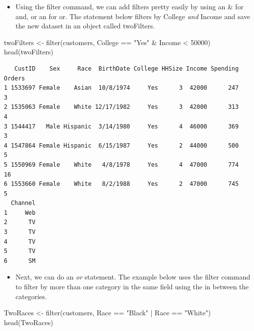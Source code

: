 \documentclass[
  letterpaper,
  DIV=11,
  numbers=noendperiod]{scrreprt}
\newenvironment{Shaded}{\begin{snugshade}}{\end{snugshade}}
\newcommand{\DecValTok}[1]{\textcolor[rgb]{0.68,0.00,0.00}{#1}}
\newcommand{\FunctionTok}[1]{\textcolor[rgb]{0.28,0.35,0.67}{#1}}
\newcommand{\NormalTok}[1]{\textcolor[rgb]{0.00,0.23,0.31}{#1}}
\newcommand{\OtherTok}[1]{\textcolor[rgb]{0.00,0.23,0.31}{#1}}
\newcommand{\SpecialCharTok}[1]{\textcolor[rgb]{0.37,0.37,0.37}{#1}}
\newcommand{\StringTok}[1]{\textcolor[rgb]{0.13,0.47,0.30}{#1}}
\providecommand{\tightlist}{%
  \setlength{\itemsep}{0pt}\setlength{\parskip}{0pt}}\usepackage{longtable,booktabs,array}
\begin{document}
\begin{itemize}
\tightlist
\item
  Using the filter command, we can add filters pretty easily by using an
  \& for and, or an \textbar{} for or. The statement below filters by
  College \emph{and} Income and save the new dataset in an object called
  twoFilters.
\end{itemize}

\begin{Shaded}
\begin{Highlighting}[]
\NormalTok{twoFilters }\OtherTok{\textless{}{-}} \FunctionTok{filter}\NormalTok{(customers, College }\SpecialCharTok{==} \StringTok{"Yes"} \SpecialCharTok{\&}\NormalTok{ Income }\SpecialCharTok{\textless{}} \DecValTok{50000}\NormalTok{)}
\FunctionTok{head}\NormalTok{(twoFilters)}
\end{Highlighting}
\end{Shaded}

\begin{verbatim}
   CustID    Sex     Race  BirthDate College HHSize Income Spending Orders
1 1533697 Female    Asian  10/8/1974     Yes      3  42000      247      3
2 1535063 Female    White 12/17/1982     Yes      3  42000      313      4
3 1544417   Male Hispanic  3/14/1980     Yes      4  46000      369      3
4 1547864 Female Hispanic  6/15/1987     Yes      2  44000      500      5
5 1550969 Female    White   4/8/1978     Yes      4  47000      774     16
6 1553660 Female    White   8/2/1988     Yes      2  47000      745      5
  Channel
1     Web
2      TV
3      TV
4      TV
5      TV
6      SM
\end{verbatim}

\begin{itemize}
\tightlist
\item
  Next, we can do an \emph{or} statement. The example below uses the
  filter command to filter by more than one category in the same field
  using the \textbar{} in between the categories.
\end{itemize}

\begin{Shaded}
\begin{Highlighting}[]
\NormalTok{TwoRaces }\OtherTok{\textless{}{-}} \FunctionTok{filter}\NormalTok{(customers, Race }\SpecialCharTok{==} \StringTok{"Black"} \SpecialCharTok{|}\NormalTok{ Race }\SpecialCharTok{==} \StringTok{"White"}\NormalTok{)}
\FunctionTok{head}\NormalTok{(TwoRaces)}
\end{Highlighting}
\end{Shaded}
\end{document}
